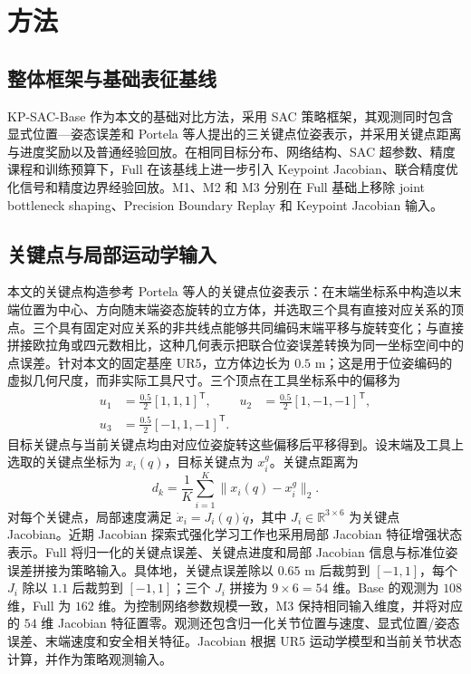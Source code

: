 \documentclass[conference]{IEEEtran}
\begin{document}
\section{方法}
\subsection{整体框架与基础表征基线}
KP-SAC-Base 作为本文的基础对比方法，采用 SAC 策略框架，其观测同时包含显式位置—姿态误差和 Portela 等人提出的三关键点位姿表示，并采用关键点距离与进度奖励以及普通经验回放。在相同目标分布、网络结构、SAC 超参数、精度课程和训练预算下，Full 在该基线上进一步引入 Keypoint Jacobian、联合精度优化信号和精度边界经验回放。M1、M2 和 M3 分别在 Full 基础上移除 joint bottleneck shaping、Precision Boundary Replay 和 Keypoint Jacobian 输入。

\subsection{关键点与局部运动学输入}
本文的关键点构造参考 Portela 等人的关键点位姿表示\cite{portela2025wholebody}：在末端坐标系中构造以末端位置为中心、方向随末端姿态旋转的立方体，并选取三个具有直接对应关系的顶点。三个具有固定对应关系的非共线点能够共同编码末端平移与旋转变化；与直接拼接欧拉角或四元数相比，这种几何表示把联合位姿误差转换为同一坐标空间中的点误差。针对本文的固定基座 UR5，立方体边长为 $0.5$ m；这是用于位姿编码的虚拟几何尺度，而非实际工具尺寸。三个顶点在工具坐标系中的偏移为
\begin{equation*}
\begin{aligned}
u_1&=\tfrac{0.5}{2}[1,1,1]^{\mathsf T}, &
u_2&=\tfrac{0.5}{2}[1,-1,-1]^{\mathsf T},\\
u_3&=\tfrac{0.5}{2}[-1,1,-1]^{\mathsf T}.&&
\end{aligned}
\end{equation*}
目标关键点与当前关键点均由对应位姿旋转这些偏移后平移得到。设末端及工具上选取的关键点坐标为 $x_i(q)$，目标关键点为 $x_i^g$。关键点距离为
\begin{equation}
d_k=\frac{1}{K}\sum_{i=1}^{K}\|x_i(q)-x_i^g\|_2 .
\label{eq:keypoint}
\end{equation}
对每个关键点，局部速度满足 $\dot x_i=J_i(q)\dot q$，其中 $J_i\in\mathbb{R}^{3\times6}$ 为关键点 Jacobian。近期 Jacobian 探索式强化学习工作也采用局部 Jacobian 特征增强状态表示\cite{tian2025jedprl}。Full 将归一化的关键点误差、关键点进度和局部 Jacobian 信息与标准位姿误差拼接为策略输入。具体地，关键点误差除以 $0.65$ m 后裁剪到 $[-1,1]$，每个 $J_i$ 除以 $1.1$ 后裁剪到 $[-1,1]$；三个 $J_i$ 拼接为 $9\times6=54$ 维。Base 的观测为 $108$ 维，Full 为 $162$ 维。为控制网络参数规模一致，M3 保持相同输入维度，并将对应的 $54$ 维 Jacobian 特征置零。观测还包含归一化关节位置与速度、显式位置/姿态误差、末端速度和安全相关特征。Jacobian 根据 UR5 运动学模型和当前关节状态计算，并作为策略观测输入。
\end{document}
